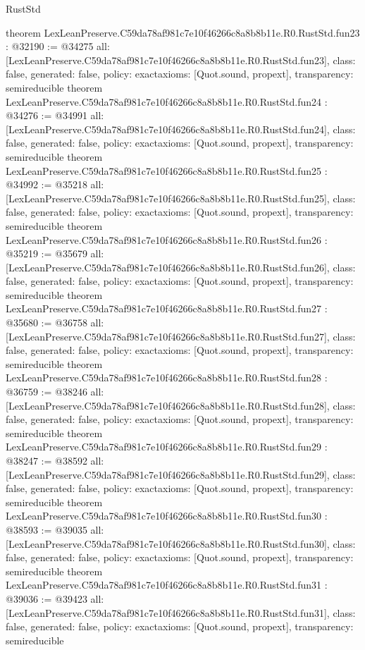 \begin{lexlean}{RustStd}
\begin{coremodule}
{}
theorem LexLeanPreserve.C59da78af981c7e10f46266c8a8b8b11e.R0.RustStd.fun23 : @32190 := @34275 {
  all: [LexLeanPreserve.C59da78af981c7e10f46266c8a8b8b11e.R0.RustStd.fun23],
  class: false,
  generated: false,
  policy: exact{axioms: [Quot.sound, propext]},
  transparency: semireducible
}
theorem LexLeanPreserve.C59da78af981c7e10f46266c8a8b8b11e.R0.RustStd.fun24 : @34276 := @34991 {
  all: [LexLeanPreserve.C59da78af981c7e10f46266c8a8b8b11e.R0.RustStd.fun24],
  class: false,
  generated: false,
  policy: exact{axioms: [Quot.sound, propext]},
  transparency: semireducible
}
theorem LexLeanPreserve.C59da78af981c7e10f46266c8a8b8b11e.R0.RustStd.fun25 : @34992 := @35218 {
  all: [LexLeanPreserve.C59da78af981c7e10f46266c8a8b8b11e.R0.RustStd.fun25],
  class: false,
  generated: false,
  policy: exact{axioms: [Quot.sound, propext]},
  transparency: semireducible
}
theorem LexLeanPreserve.C59da78af981c7e10f46266c8a8b8b11e.R0.RustStd.fun26 : @35219 := @35679 {
  all: [LexLeanPreserve.C59da78af981c7e10f46266c8a8b8b11e.R0.RustStd.fun26],
  class: false,
  generated: false,
  policy: exact{axioms: [Quot.sound, propext]},
  transparency: semireducible
}
theorem LexLeanPreserve.C59da78af981c7e10f46266c8a8b8b11e.R0.RustStd.fun27 : @35680 := @36758 {
  all: [LexLeanPreserve.C59da78af981c7e10f46266c8a8b8b11e.R0.RustStd.fun27],
  class: false,
  generated: false,
  policy: exact{axioms: [Quot.sound, propext]},
  transparency: semireducible
}
theorem LexLeanPreserve.C59da78af981c7e10f46266c8a8b8b11e.R0.RustStd.fun28 : @36759 := @38246 {
  all: [LexLeanPreserve.C59da78af981c7e10f46266c8a8b8b11e.R0.RustStd.fun28],
  class: false,
  generated: false,
  policy: exact{axioms: [Quot.sound, propext]},
  transparency: semireducible
}
theorem LexLeanPreserve.C59da78af981c7e10f46266c8a8b8b11e.R0.RustStd.fun29 : @38247 := @38592 {
  all: [LexLeanPreserve.C59da78af981c7e10f46266c8a8b8b11e.R0.RustStd.fun29],
  class: false,
  generated: false,
  policy: exact{axioms: [Quot.sound, propext]},
  transparency: semireducible
}
theorem LexLeanPreserve.C59da78af981c7e10f46266c8a8b8b11e.R0.RustStd.fun30 : @38593 := @39035 {
  all: [LexLeanPreserve.C59da78af981c7e10f46266c8a8b8b11e.R0.RustStd.fun30],
  class: false,
  generated: false,
  policy: exact{axioms: [Quot.sound, propext]},
  transparency: semireducible
}
theorem LexLeanPreserve.C59da78af981c7e10f46266c8a8b8b11e.R0.RustStd.fun31 : @39036 := @39423 {
  all: [LexLeanPreserve.C59da78af981c7e10f46266c8a8b8b11e.R0.RustStd.fun31],
  class: false,
  generated: false,
  policy: exact{axioms: [Quot.sound, propext]},
  transparency: semireducible
}
\end{coremodule}
\end{lexlean}
